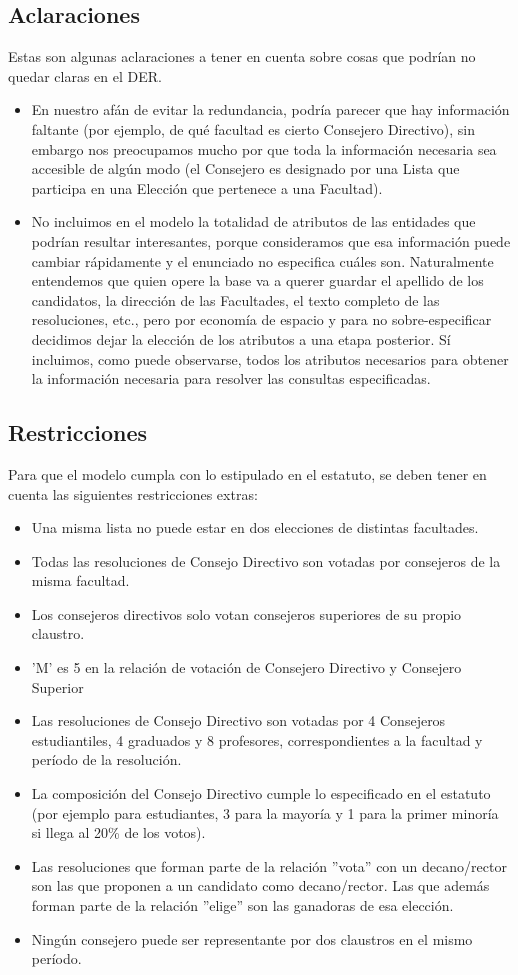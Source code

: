 \subsection{Aclaraciones}
Estas son algunas aclaraciones a tener en cuenta sobre cosas que podrían no quedar claras en el DER.
\begin{itemize}
\item En nuestro afán de evitar la redundancia, podría parecer que hay información faltante (por ejemplo, de qué facultad es cierto Consejero Directivo), sin embargo nos preocupamos mucho por que toda la información necesaria sea accesible de algún modo (el Consejero es designado por una Lista que participa en una Elección que pertenece a una Facultad).
\item No incluimos en el modelo la totalidad de atributos de las entidades que podrían resultar interesantes, porque consideramos que esa información puede cambiar rápidamente y el enunciado no especifica cuáles son. Naturalmente entendemos que quien opere la base va a querer guardar el apellido de los candidatos, la dirección de las Facultades, el texto completo de las resoluciones, etc., pero por economía de espacio y para no sobre-especificar decidimos dejar la elección de los atributos a una etapa posterior. Sí incluimos, como puede observarse, todos los atributos necesarios para obtener la información necesaria para resolver las consultas especificadas.
\end{itemize}

\subsection{Restricciones}
Para que el modelo cumpla con lo estipulado en el estatuto, se deben tener en cuenta las siguientes restricciones extras:

\begin{itemize}
\item Una misma lista no puede estar en dos elecciones de distintas facultades.
\item Todas las resoluciones de Consejo Directivo son votadas por consejeros de la misma facultad.
\item Los consejeros directivos solo votan consejeros superiores de su propio claustro.
\item 'M' es 5 en la relación de votación de Consejero Directivo y Consejero Superior
\item Las resoluciones de Consejo Directivo son votadas por 4 Consejeros estudiantiles, 4 graduados y 8 profesores, correspondientes a la facultad y período de la resolución.
\item La composición del Consejo Directivo cumple lo especificado en el estatuto (por ejemplo para estudiantes, 3 para la mayoría y 1 para la primer minoría si llega al 20\% de los votos).
\item Las resoluciones que forman parte de la relación ''vota'' con un decano/rector son las que proponen a un candidato como decano/rector. Las que además forman parte de la relación ''elige'' son las ganadoras de esa elección.
\item Ningún consejero puede ser representante por dos claustros en el mismo período.
\end{itemize}

